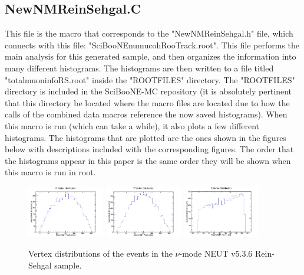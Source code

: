 \documentclass[11pt]{article}
\begin{document}
\subsection{NewNMReinSehgal.C}
\label{sub:NewNMReinSehgal.C}
This file is the macro that corresponds to the "NewNMReinSehgal.h" file, which connects with this file: "SciBooNE\textunderscore numu\textunderscore coh\textunderscore RooTrack.root". This file performs the main analysis for this generated sample, and then organizes the information into many different histograms. The histograms are then written to a file titled "totalmuoninfoRS.root" inside the "ROOTFILES" directory. The "ROOTFILES" directory is included in the SciBooNE-MC repository (it is absolutely pertinent that this directory be located where the macro files are located due to how the calls of the combined data macros reference the now saved histograms). When this macro is run (which can take a while), it also plots a few different histograms. The histograms that are plotted are the ones shown in the figures below with descriptions included with the corresponding figures. The order that the histograms appear in this paper is the same order they will be shown when this macro is run in root.

\begin{figure}[H]
\centering
\includegraphics[width=0.3\textwidth]{NewNMReinSehgalImages/4-XVertexDistributionNMRS.png}
\includegraphics[width=0.3\textwidth]{NewNMReinSehgalImages/3-YVertexDistributionNMRS.png}
\includegraphics[width=0.3\textwidth]{NewNMReinSehgalImages/2-ZVertexDistributionNMRS.png}
\caption{Vertex distributions of the events in the $\nu$-mode NEUT v5.3.6 Rein-Sehgal sample.}
\label{fig:app:NMVertexDistributionRS}
\end{figure}
\end{document}
